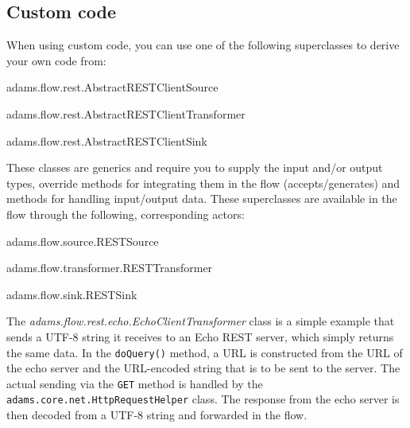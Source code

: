 \documentclass[a4paper]{book}
\begin{document}
\subsection{Custom code}
When using custom code, you can use one of the following superclasses to derive
your own code from:
\begin{tight_itemize}
  \item adams.flow.rest.AbstractRESTClientSource
  \item adams.flow.rest.AbstractRESTClientTransformer
  \item adams.flow.rest.AbstractRESTClientSink
\end{tight_itemize}
These classes are generics and require you to supply the input and/or output
types, override methods for integrating them in the flow (accepts/generates)
and methods for handling input/output data.
These superclasses are available in the flow through the following, corresponding
actors:
\begin{tight_itemize}
  \item adams.flow.source.RESTSource
  \item adams.flow.transformer.RESTTransformer
  \item adams.flow.sink.RESTSink
\end{tight_itemize}

The \textit{adams.flow.rest.echo.EchoClientTransformer} class is a simple
example that sends a UTF-8 string it receives to an Echo REST server, which simply
returns the same data. In the \verb|doQuery()| method, a URL is constructed
from the URL of the echo server and the URL-encoded string that is to be sent
to the server. The actual sending via the \verb|GET| method is handled by the
\verb|adams.core.net.HttpRequestHelper| class. The response from the echo
server is then decoded from a UTF-8 string and forwarded in the flow.
\end{document}
